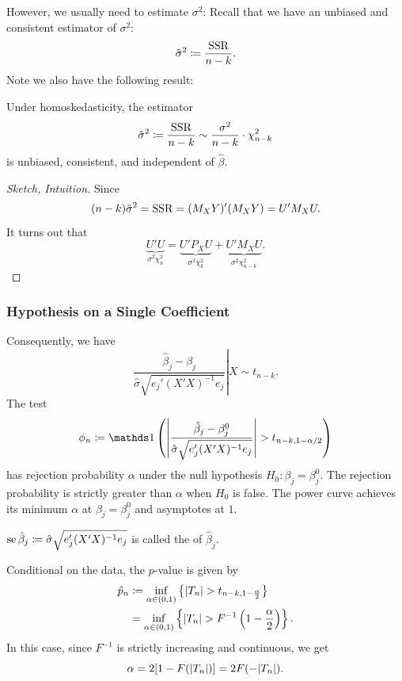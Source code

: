 \documentclass[letterpaper, 10pt]{article}
\begin{document}
However, we usually need to estimate \(\sigma^2\):
Recall that we have an unbiased and consistent estimator of \(\sigma^2\):
\[
  \hat{\sigma}^2
  \coloneqq \frac{\operatorname{SSR}}{n - k}.
\]
Note we also have the following result:
\begin{proposition}
  Under homoskedasticity, the estimator
  \[
    \hat{\sigma}^2
    \coloneqq \frac{\operatorname{SSR}}{n - k}
    \sim \frac{\sigma^2}{n - k} \cdot \chi_{n - k}^2
  \]
  is unbiased, consistent, and independent of \(\hat{\beta}\).
\end{proposition}
\begin{proof}[Sketch, Intuition]
  Since
  \[
    (n - k) \hat{\sigma}^2
    = \operatorname{SSR}
    = (M_X Y)' (M_X Y)
    = U' M_X U.
  \]
  It turns out that
  \[
    \underbrace{U'U}_{\sigma^2 \chi_n^2}
    = \underbrace{U' P_{X} U}_{\sigma^2 \chi_{k}^2}
      + \underbrace{U' M_{X} U}_{\sigma^2 \chi_{n - k}^2}.
  \]
\end{proof}

\subsubsection{Hypothesis on a Single Coefficient}
Consequently, we have
\[
  \left. \frac{\hat{\beta}_j - \beta_j}{\hat{\sigma} \sqrt{e_j' (X' X)^{-1} e_j}} \right| X
  \sim t_{n - k}.
\]
The test
\[
  \phi_n \coloneqq \ind\left( \abs*{\frac{\hat{\beta}_j - \beta_j^0}{\hat{\sigma} \sqrt{e_j' (X' X)^{-1} e_j}}} > t_{n - k, 1 - \alpha / 2} \right)
\]
has rejection probability \(\alpha\) under the null hypothesis \(H_0: \beta_j = \beta_j^0\).
The rejection probability is strictly greater than \(\alpha\) when \(H_0\) is false.
The power curve achieves its minimum \(\alpha\) at \(\beta_j = \beta_j^0\) and asymptotes at \(1\).

\begin{definition}
  \(\operatorname{se} \hat{\beta}_j \coloneqq \hat{\sigma} \sqrt{e_j' (X'X)^{-1} e_j}\) is called the  of \(\hat{\beta}_j\).
\end{definition}

Conditional on the data, the \(p\)-value is given by
\begin{align*}
  \hat{p}_n
  &\coloneqq \inf_{\alpha \in (0, 1)} \left\{ \lvert T_n\rvert > t_{n - k, 1 - \frac{\alpha}{2}} \right\} \\
  &= \inf_{\alpha \in (0, 1)} \left\{ \lvert T_n\rvert > F^{-1}\left( 1 - \frac{\alpha}{2} \right) \right\}.
\end{align*}
In this case, since \(F^{-1}\) is strictly increasing and continuous, we get
\[
  \alpha = 2 [1 - F(\lvert T_n\rvert)]
  = 2 F(- \lvert T_n\rvert).
\]
\end{document}
